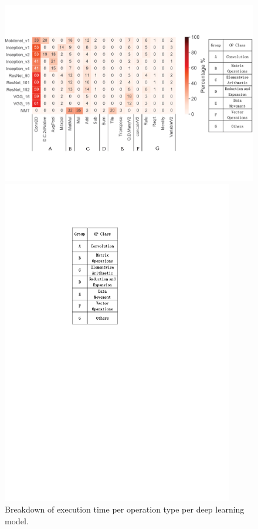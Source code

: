 
\begin{figure}
\centering
\begin{minipage}[c]{0.7\textwidth}
\centering
\includegraphics[width=1\textwidth]{figure/break11models.pdf}
\end{minipage}%
\begin{minipage}[c]{0.16\textwidth}
\centering
\includegraphics[width=0.9\textwidth]{figure/break11label1.pdf}
\end{minipage}
\caption{Breakdown of execution time per operation type per deep learning model.}
 \label{fig:breakdown11}
\end{figure}



